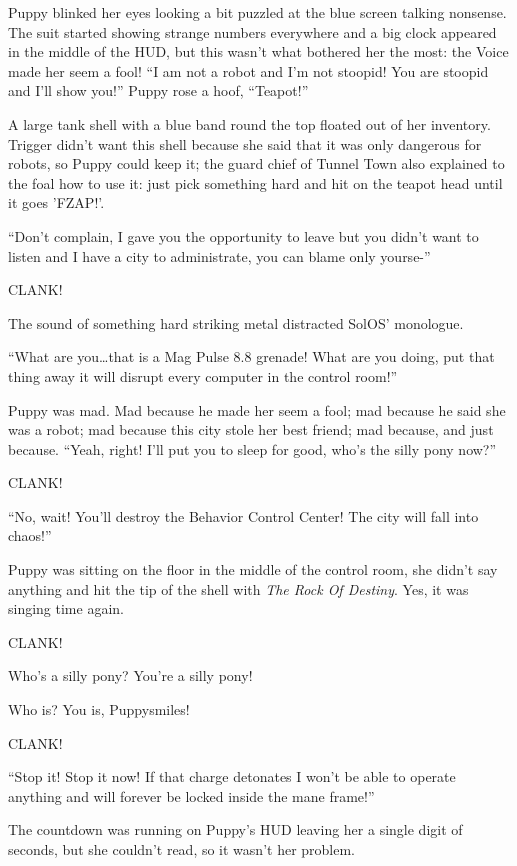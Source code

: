 Puppy blinked her eyes looking a bit puzzled at the blue screen talking nonsense. The suit started showing strange numbers everywhere and a big clock appeared in the middle of the HUD, but this wasn't what bothered her the most: the Voice made her seem a fool! ``I am not a robot and I'm not stoopid! You are stoopid and I'll show you!'' Puppy rose a hoof, ``Teapot!''

A large tank shell with a blue band round the top floated out of her inventory. Trigger didn't want this shell because she said that it was only dangerous for robots, so Puppy could keep it; the guard chief of Tunnel Town also explained to the foal how to use it: just pick something hard and hit on the teapot head until it goes 'FZAP!'.

``Don't complain, I gave you the opportunity to leave but you didn't want to listen and I have a city to administrate, you can blame only yourse-''

CLANK!

The sound of something hard striking metal distracted SolOS' monologue.

``What are you\dots that is a Mag Pulse 8.8 grenade! What are you doing, put that thing away it will disrupt every computer in the control room!''

Puppy was mad. Mad because he made her seem a fool; mad because he said she was a robot; mad because this city stole her best friend; mad because, and just because. ``Yeah, right! I'll put you to sleep for good, who's the silly pony now?''

CLANK!

``No, wait! You'll destroy the Behavior Control Center! The city will fall into chaos!''

Puppy was sitting on the floor in the middle of the control room, she didn't say anything and hit the tip of the shell with \emph{The Rock Of Destiny}. Yes, it was singing time again.

CLANK!

\begin{song}
    Who's a silly pony? You're a silly pony!

    Who is? You is, Puppysmiles!
\end{song}

CLANK!

``Stop it! Stop it now! If that charge detonates I won't be able to operate anything and will forever be locked inside the mane frame!''

The countdown was running on Puppy's HUD leaving her a single digit of seconds, but she couldn't read, so it wasn't her problem.


